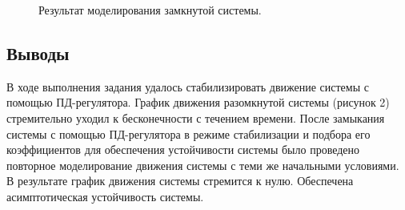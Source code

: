 \documentclass[a5paper, 10pt]{article}
\theoremstyle{definition}
\theoremstyle{plain}
\theoremstyle{remark}
\begin{document}
\begin{figure}[h!]
\caption{Результат моделирования замкнутой системы.}
\end{figure}

\subsection{Выводы}
В ходе выполнения задания удалось стабилизировать движение системы с помощью ПД-регулятора. График движения разомкнутой системы (рисунок 2) стремительно уходил к бесконечности с течением времени. После замыкания системы с помощью ПД-регулятора в режиме стабилизации и подбора его коэффициентов для обеспечения устойчивости системы было проведено повторное моделирование движения системы с теми же начальными условиями. В результате график движения системы стремится к нулю. Обеспечена асимптотическая устойчивость системы.

\newpage
\end{document}
